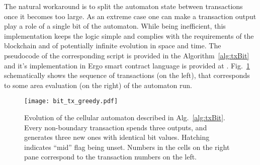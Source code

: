 \documentclass[runningheads]{llncs}
\begin{document}
    The natural workaround is to split the automaton state between
    transactions once it becomes too large. As an extreme case one can make a
    transaction output play a role of a single bit of the automaton. While being
    inefficient, this implementation keeps the logic simple and complies with the
    requirements of the blockchain and of potentially infinite evolution in
    space and time. The pseudocode of the corresponding script is
    provided in the Algorithm~\ref{alg:txBit} and it's implementation in Ergo smart
    contract language is provided at \cite{ergoScript2}. Fig.~\ref{fig:bit_txs}
    schematically shows the sequence of transactions (on the left), that corresponds
    to some area evaluation (on the right) of the automaton run.
    \begin{figure}[h]
        \centering
        \texttt{[image: bit\_tx\_greedy.pdf]}
        \caption{Evolution of the cellular automaton described in
            Alg.~\ref{alg:txBit}. Every non-boundary transaction spends three
            outputs, and generates three new ones with identical bit values.
            Hatching indicates ``mid'' flag being unset. Numbers in the cells on
            the right pane correspond to the transaction numbers on the left.
        \label{fig:bit_txs} }
    \end{figure}
\end{document}
